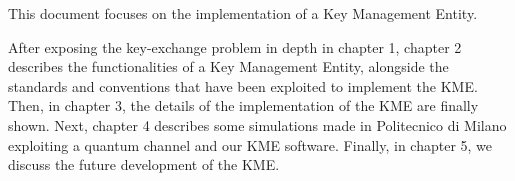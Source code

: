 \documentclass{Configuration_Files/PoliMi3i_thesis}
\begin{document}
This document focuses on the implementation of a Key Management Entity.

After exposing the key-exchange problem in depth in chapter 1, chapter 2 describes the functionalities of a Key Management Entity, alongside the standards and conventions that have been exploited to implement the KME. Then, in chapter 3, the details of the implementation of the KME are finally shown. Next, chapter 4 describes some simulations made in Politecnico di Milano exploiting a quantum channel and our KME software. Finally, in chapter 5, we discuss the future development of the KME.











\cleardoublepage
{} %
\appendix

\listoffigures

\cleardoublepage
\end{document}
